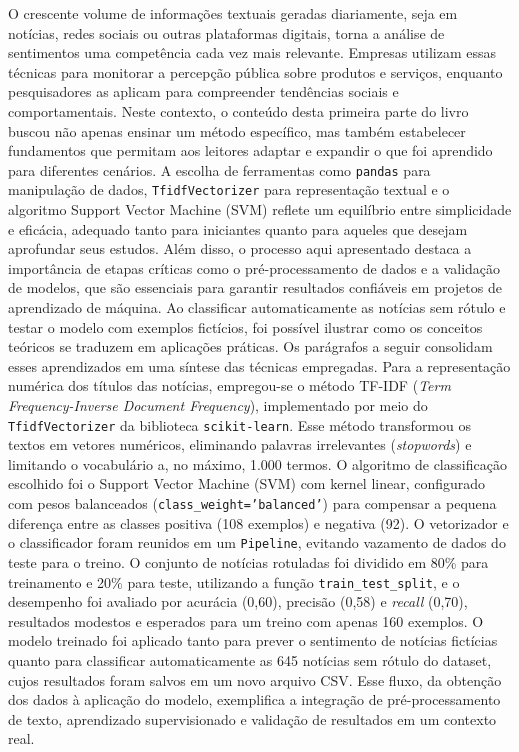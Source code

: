 \documentclass[a4paper,12pt,openany]{book}
\begin{document}
O crescente volume de informações textuais geradas diariamente, seja em notícias, redes sociais ou outras plataformas digitais, torna a análise de sentimentos uma competência cada vez mais relevante. Empresas utilizam essas técnicas para monitorar a percepção pública sobre produtos e serviços, enquanto pesquisadores as aplicam para compreender tendências sociais e comportamentais. Neste contexto, o conteúdo desta primeira parte do livro buscou não apenas ensinar um método específico, mas também estabelecer fundamentos que permitam aos leitores adaptar e expandir o que foi aprendido para diferentes cenários. A escolha de ferramentas como \texttt{pandas} para manipulação de dados, \texttt{TfidfVectorizer} para representação textual e o algoritmo Support Vector Machine (SVM) reflete um equilíbrio entre simplicidade e eficácia, adequado tanto para iniciantes quanto para aqueles que desejam aprofundar seus estudos.
Além disso, o processo aqui apresentado destaca a importância de etapas críticas como o pré-processamento de dados e a validação de modelos, que são essenciais para garantir resultados confiáveis em projetos de aprendizado de máquina. Ao classificar automaticamente as notícias sem rótulo e testar o modelo com exemplos fictícios, foi possível ilustrar como os conceitos teóricos se traduzem em aplicações práticas. Os parágrafos a seguir consolidam esses aprendizados em uma síntese das técnicas empregadas.
Para a representação numérica dos títulos das notícias, empregou-se o método TF-IDF (\textit{Term Frequency-Inverse Document Frequency}), implementado por meio do \texttt{TfidfVectorizer} da biblioteca \texttt{scikit-learn}. Esse método transformou os textos em vetores numéricos, eliminando palavras irrelevantes (\textit{stopwords}) e limitando o vocabulário a, no máximo, 1.000 termos. O algoritmo de classificação escolhido foi o Support Vector Machine (SVM) com kernel linear, configurado com pesos balanceados (\texttt{class\_weight='balanced'}) para compensar a pequena diferença entre as classes positiva (108 exemplos) e negativa (92). O vetorizador e o classificador foram reunidos em um \texttt{Pipeline}, evitando vazamento de dados do teste para o treino. O conjunto de notícias rotuladas foi dividido em 80\% para treinamento e 20\% para teste, utilizando a função \texttt{train\_test\_split}, e o desempenho foi avaliado por acurácia (0,60), precisão (0,58) e \textit{recall} (0,70), resultados modestos e esperados para um treino com apenas 160 exemplos.
O modelo treinado foi aplicado tanto para prever o sentimento de notícias fictícias quanto para classificar automaticamente as 645 notícias sem rótulo do dataset, cujos resultados foram salvos em um novo arquivo CSV. Esse fluxo, da obtenção dos dados à aplicação do modelo, exemplifica a integração de pré-processamento de texto, aprendizado supervisionado e validação de resultados em um contexto real.
\end{document}
